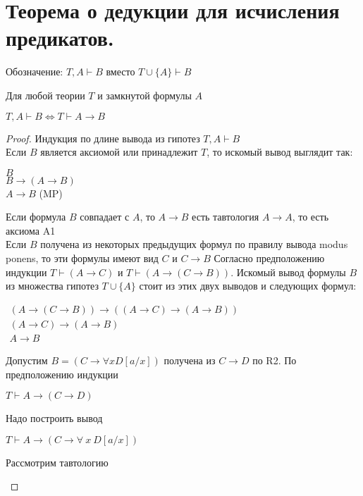 \section{Теорема о дедукции для исчисления предикатов.}
Обозначение: $T,A \vdash B$ вместо $T \cup \{A\} \vdash B$
\begin{theorem}
	Для любой теории $T$ и замкнутой формулы $A$
	\begin{center}
		$T, A \vdash B \Longleftrightarrow T \vdash A \rightarrow B$
	\end{center}
\end{theorem}
\begin{proof}
	Индукция по длине вывода из гипотез $T,A \vdash B$\\
	Если $B$ является аксиомой или принадлежит $T$, то искомый вывод выглядит так:
	\begin{center}
		$B$\\
		$B \rightarrow(A \rightarrow B)$\\
		$A \rightarrow B$   (MP)
	\end{center}
	Если формула $B$ совпадает с $A$, то $A \rightarrow B$ есть тавтология $A \rightarrow A$, то есть аксиома A1\\
	Если $B$ получена из некоторых предыдущих формул по правилу вывода
	modus ponens, то эти формулы имеют вид $C$ и $C\rightarrow B$ Согласно предположению индукции $T \vdash (A
	\rightarrow C)$ и $T \vdash (A \rightarrow (C \rightarrow B))$. Искомый вывод формулы $B$
	из множества гипотез  $T \cup \{A\}$ стоит из этих двух выводов и следующих
	формул:
	\begin{center}
		$\begin{array}{l}
			{(A \rightarrow(C \rightarrow B)) \rightarrow((A \rightarrow C) \rightarrow(A \rightarrow B))} \\
			{(A \rightarrow C) \rightarrow(A \rightarrow B)} \\
			{A \rightarrow B}
		\end{array}$
	\end{center}
	Допустим $B=(C \rightarrow \forall x D[a / x])$ получена из $C \rightarrow D$ по R2. По предположению индукции
	\begin{center}
		$T\vdash A \rightarrow(C\rightarrow D)$
	\end{center}
	Надо построить вывод
	\begin{center}
		$T\vdash A \rightarrow(C\rightarrow \forall\:x\:D[a/x])$
	\end{center}
	Рассмотрим тавтологию
	\begin{center}

\end{center}
\end{proof}
